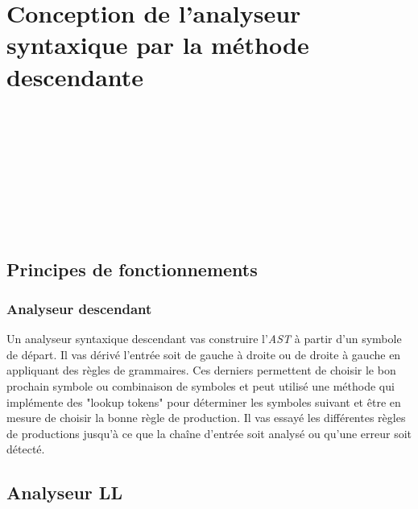 \section{Conception de l'analyseur syntaxique par la méthode descendante}

 \\
 \\
 \\
 \\
 \\
 \\
 \\
 \\

\subsection{Principes de fonctionnements}

\subsubsection{Analyseur descendant}

Un analyseur syntaxique descendant vas construire l'\textit{AST} à partir
d'un symbole de départ. Il vas dérivé l'entrée soit de gauche à droite ou de
droite à gauche en appliquant des règles de grammaires. Ces derniers
permettent de choisir le bon prochain symbole ou combinaison de symboles et
peut utilisé une méthode qui implémente des "lookup tokens" pour
déterminer les symboles suivant et être en mesure de choisir la bonne règle
de production. Il vas essayé les différentes règles de productions jusqu'à ce
que la chaîne d'entrée soit analysé ou qu'une erreur soit détecté.

\subsection{Analyseur LL}

